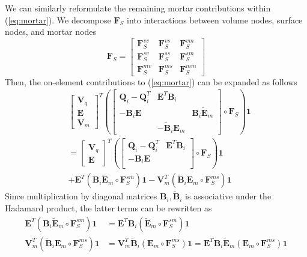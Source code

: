 \documentclass{svjour3}                     %
\renewcommand{\tilde}{\widetilde}
\newcommand{\LRp}[1]{\left( #1 \right)}
\begin{document}
We can similarly reformulate the remaining mortar contributions within (\ref{eq:mortar}).  We decompose $\bm{F}_S$ into interactions between volume nodes, surface nodes, and mortar nodes
\[
\bm{F}_S = \begin{bmatrix}
\bm{F}_S^{vv} & \bm{F}_S^{vs} & \bm{F}_S^{vm}\\
\bm{F}_S^{sv} & \bm{F}_S^{ss} & \bm{F}_S^{sm}\\
\bm{F}_S^{mv} & \bm{F}_S^{ms} & \bm{F}_S^{mm}
\end{bmatrix}
\]
Then, the on-element contributions to (\ref{eq:mortar}) can be expanded as follows
\begin{align*}
&\begin{bmatrix} \bm{V}_q \\ \bm{E} \\ \bm{V}_m \end{bmatrix}^T
\LRp{\begin{bmatrix}
\bm{Q}_i-\bm{Q}_i^T & \bm{E}^T\bm{B}_i &\\
-\bm{B}_i\bm{E} &  & \bm{B}_i\tilde{\bm{E}}_m \\
& -\tilde{\bm{B}}_i{\bm{E}}_m & 
\end{bmatrix} \circ \bm{F}_S}\bm{1} \\
&= 
\begin{bmatrix} \bm{V}_q \\ \bm{E} \end{bmatrix}^T
\LRp{\begin{bmatrix}
\bm{Q}_i-\bm{Q}_i^T & \bm{E}^T\bm{B}_i\\
-\bm{B}_i\bm{E} & \\
\end{bmatrix} \circ \bm{F}_S}\bm{1} \\
&+ \bm{E}^T \LRp{\bm{B}_i\tilde{\bm{E}}_m\circ \bm{F}_S^{sm}}\bm{1} - \bm{V}_m^T \LRp{ \tilde{\bm{B}}_i\bm{E}_m \circ \bm{F}_S^{ms}}\bm{1}
\end{align*}
Since multiplication by diagonal matrices $\bm{B}_i, \tilde{\bm{B}}_i$ is associative under the Hadamard product, the latter terms can be rewritten as 
\begin{align*}
 \bm{E}^T \LRp{\bm{B}_i\tilde{\bm{E}}_m\circ \bm{F}_S^{sm}}\bm{1} &=  \bm{E}^T \bm{B}_i \LRp{\tilde{\bm{E}}_m\circ \bm{F}_S^{sm}}\bm{1}\\
\bm{V}_m^T \LRp{ \tilde{\bm{B}}_i\bm{E}_m \circ \bm{F}_S^{ms}}\bm{1} &= \bm{V}_m^T \tilde{\bm{B}}_i \LRp{ \bm{E}_m \circ \bm{F}_S^{ms}}\bm{1} = \bm{E}^T \bm{B}_i \tilde{\bm{E}}_m \LRp{ \bm{E}_m \circ \bm{F}_S^{ms}}\bm{1} 
\end{align*}
\end{document}
